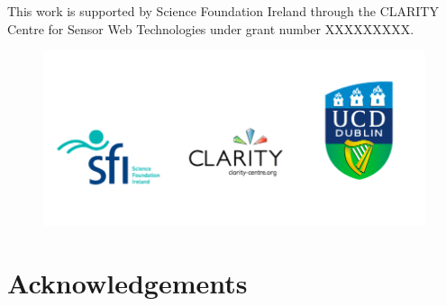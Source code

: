 

\vspace*{\fill}
{\Large This work is supported by Science Foundation Ireland through the CLARITY Centre for Sensor Web Technologies  under grant number XXXXXXXXX.}

\begin{figure}[h!]
  \centering
    \includegraphics[width=1\textwidth]{figures/ack}
    \end{figure}
\vspace*{\fill}



\newpage 



\begingroup


\chapter*{Acknowledgements} %

\blindtext

\blindtext



\endgroup